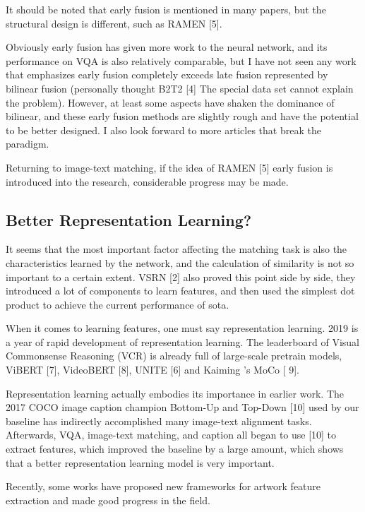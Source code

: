 It should be noted that early fusion is mentioned in many papers, but the structural design is different, such as RAMEN [5].

Obviously early fusion has given more work to the neural network, and its performance on VQA is also relatively comparable, but I have not seen any work that emphasizes early fusion completely exceeds late fusion represented by bilinear fusion (personally thought B2T2 [4] The special data set cannot explain the problem). However, at least some aspects have shaken the dominance of bilinear, and these early fusion methods are slightly rough and have the potential to be better designed. I also look forward to more articles that break the paradigm.

Returning to image-text matching, if the idea of RAMEN [5] early fusion is introduced into the research, considerable progress may be made.

\subsection{Better Representation Learning?}

It seems that the most important factor affecting the matching task is also the characteristics learned by the network, and the calculation of similarity is not so important to a certain extent. VSRN [2] also proved this point side by side, they introduced a lot of components to learn features, and then used the simplest dot product to achieve the current performance of sota.

When it comes to learning features, one must say representation learning. 2019 is a year of rapid development of representation learning. The leaderboard of Visual Commonsense Reasoning (VCR) is already full of large-scale pretrain models, ViBERT [7], VideoBERT [8], UNITE [6] and Kaiming ’s MoCo [ 9].

Representation learning actually embodies its importance in earlier work. The 2017 COCO image caption champion Bottom-Up and Top-Down [10] used by our baseline has indirectly accomplished many image-text alignment tasks. Afterwards, VQA, image-text matching, and caption all began to use [10] to extract features, which improved the baseline by a large amount, which shows that a better representation learning model is very important.

Recently, some works \cite{TranslatingArtworks,parttowhole,Art2Real,tan2017artgan,shen2019discovering} have proposed new frameworks for artwork feature extraction and made good progress in the field. 


